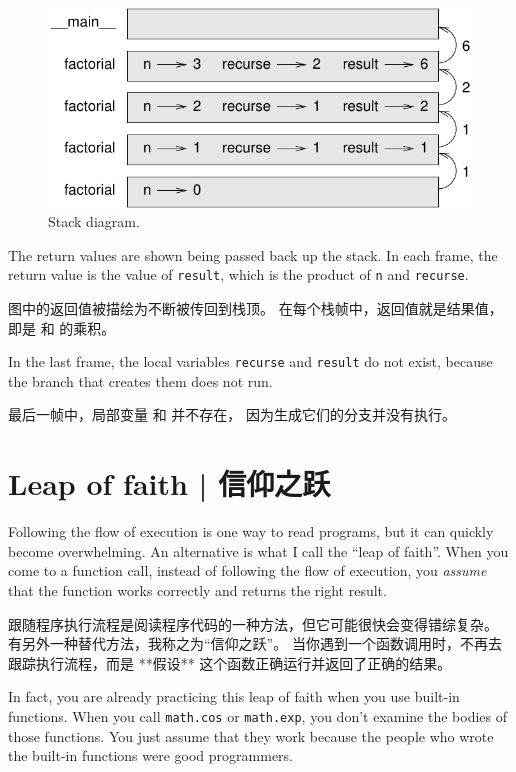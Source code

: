 \begin{figure}
\centerline
{\includegraphics[scale=0.8]{../source/figs/stack3.pdf}}
\caption{Stack diagram.}
\label{fig.stack3}
\end{figure}

The return values are shown being passed back up the stack.  In each
frame, the return value is the value of {\tt result}, which is the
product of {\tt n} and {\tt recurse}.

图中的返回值被描绘为不断被传回到栈顶。 在每个栈帧中，返回值就是结果值，即是  和  的乘积。
  

In the last frame, the local variables {\tt recurse} and {\tt result} do not exist, because the branch that creates them does not run.

最后一帧中，局部变量  和  并不存在， 因为生成它们的分支并没有执行。


\section{Leap of faith  |  信仰之跃}
  

Following the flow of execution is one way to read programs, but
it can quickly become overwhelming.  An
alternative is what I call the ``leap of faith''.  When you come to a
function call, instead of following the flow of execution, you {\em
assume} that the function works correctly and returns the right
result.

跟随程序执行流程是阅读程序代码的一种方法，但它可能很快会变得错综复杂。
有另外一种替代方法，我称之为``信仰之跃''。
当你遇到一个函数调用时，不再去跟踪执行流程，而是 **假设** 这个函数正确运行并返回了正确的结果。

In fact, you are already practicing this leap of faith when you use
built-in functions.  When you call {\tt math.cos} or {\tt math.exp},
you don't examine the bodies of those functions.  You just
assume that they work because the people who wrote the built-in
functions were good programmers.

